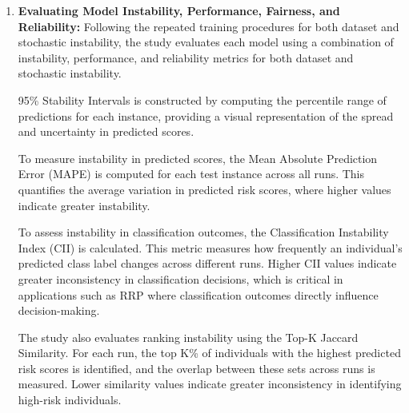 \documentclass[12pt]{article}
\begin{document}
\begin{enumerate}
  After each training run, predictions is generated using the fixed test dataset. This allows any observed differences in predictions to be attributed solely to stochastic variation rather than changes in the data. The predicted scores for each instance in the test dataset is recorded for every run. \\

  Similar to the dataset instability procedure, all predictions is stored in structured CSV files, where each column corresponds to a specific training run with a distinct random seed. This format enables direct comparison of predictions across runs at the individual level.\\

  By repeating this process across multiple random seeds, the study generates a distribution of predictions for each test instance under stochastic conditions. These distributions are then used in the later stages of the methodology.

  \item \textbf{Evaluating Model Instability, Performance, Fairness, and Reliability:}
  Following the repeated training procedures for both dataset and stochastic instability, the study evaluates each model using a combination of instability, performance, and reliability metrics for both dataset and stochastic instability.

  95\% Stability Intervals is constructed by computing the percentile range of predictions for each instance, providing a visual representation of the spread and uncertainty in predicted scores.

  To measure instability in predicted scores, the Mean Absolute Prediction Error (MAPE) is computed for each test instance across all runs. This quantifies the average variation in predicted risk scores, where higher values indicate greater instability. 

  To assess instability in classification outcomes, the Classification Instability Index (CII) is calculated. This metric measures how frequently an individual's predicted class label changes across different runs. Higher CII values indicate greater inconsistency in classification decisions, which is critical in applications such as RRP where classification outcomes directly influence decision-making. 

  The study also evaluates ranking instability using the Top-K Jaccard Similarity. For each run, the top K\% of individuals with the highest predicted risk scores is identified, and the overlap between these sets across runs is measured. Lower similarity values indicate greater inconsistency in identifying high-risk individuals.


\end{enumerate}
\end{document}
